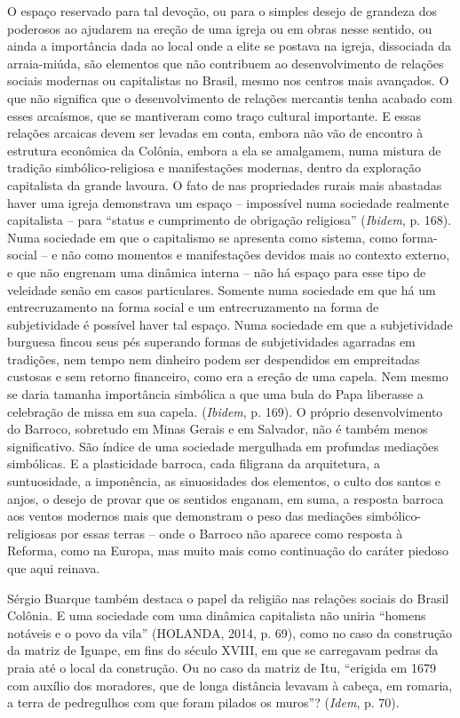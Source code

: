 O espaço reservado para tal devoção, ou para o simples desejo de
grandeza dos poderosos ao ajudarem na ereção de uma igreja ou em obras
nesse sentido, ou ainda a importância dada ao local onde a elite se
postava na igreja, dissociada da arraia-miúda, são elementos que não
contribuem ao desenvolvimento de relações sociais modernas ou
capitalistas no Brasil, mesmo nos centros mais avançados. O que não
significa que o desenvolvimento de relações mercantis tenha acabado com
esses arcaísmos, que se mantiveram como traço cultural importante. E
essas relações arcaicas devem ser levadas em conta, embora não vão de
encontro à estrutura econômica da Colônia, embora a ela se amalgamem,
numa mistura de tradição simbólico-religiosa e manifestações modernas,
dentro da exploração capitalista da grande lavoura. O fato de nas
propriedades rurais mais abastadas haver uma igreja demonstrava um
espaço -- impossível numa sociedade realmente capitalista -- para
``status e cumprimento de obrigação religiosa'' (\emph{Ibidem}, p. 168).
Numa sociedade em que o capitalismo se apresenta como sistema, como
forma-social -- e não como momentos e manifestações devidos mais ao
contexto externo, e que não engrenam uma dinâmica interna -- não há
espaço para esse tipo de veleidade senão em casos particulares. Somente
numa sociedade em que há um entrecruzamento na forma social e um
entrecruzamento na forma de subjetividade é possível haver tal espaço.
Numa sociedade em que a subjetividade burguesa fincou seus pés superando
formas de subjetividades agarradas em tradições, nem tempo nem dinheiro
podem ser despendidos em empreitadas custosas e sem retorno financeiro,
como era a ereção de uma capela. Nem mesmo se daria tamanha importância
simbólica a que uma bula do Papa liberasse a celebração de missa em sua
capela. (\emph{Ibidem}, p. 169). O próprio desenvolvimento do Barroco,
sobretudo em Minas Gerais e em Salvador, não é também menos
significativo. São índice de uma sociedade mergulhada em profundas
mediações simbólicas. E a plasticidade barroca, cada filigrana da
arquitetura, a suntuosidade, a imponência, as sinuosidades dos
elementos, o culto dos santos e anjos, o desejo de provar que os
sentidos enganam, em suma, a resposta barroca aos ventos modernos mais
que demonstram o peso das mediações simbólico-religiosas por essas
terras -- onde o Barroco não aparece como resposta à Reforma, como na
Europa, mas muito mais como continuação do caráter piedoso que aqui
reinava.

Sérgio Buarque também destaca o papel da religião nas relações sociais
do Brasil Colônia\emph{.} E uma sociedade com uma dinâmica capitalista
não uniria ``homens notáveis e o povo da vila'' (HOLANDA, 2014, p. 69),
como no caso da construção da matriz de Iguape, em fins do século XVIII,
em que se carregavam pedras da praia até o local da construção. Ou no
caso da matriz de Itu, ``erigida em 1679 com auxílio dos moradores, que
de longa distância levavam à cabeça, em romaria, a terra de pedregulhos
com que foram pilados os muros''? (\emph{Idem}, p. 70).


